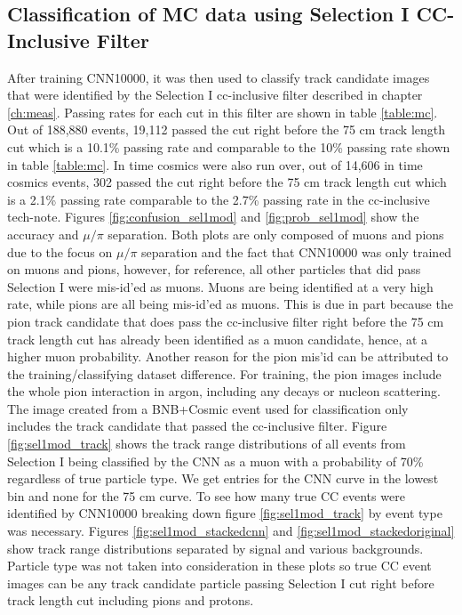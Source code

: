 \subsection{Classification of MC data using Selection I CC-Inclusive Filter}

After training CNN10000, it was then used to classify track candidate images that were identified by the Selection I cc-inclusive filter described in chapter \ref{ch:meas}. Passing rates for each cut in this filter are shown in table \ref{table:mc}. Out of 188,880 events, 19,112 passed the cut right before the 75 cm track length cut which is a 10.1\% passing rate and comparable to the 10\% passing rate shown in table \ref{table:mc}. In time cosmics were also run over, out of 14,606 in time cosmics events, 302 passed the cut right before the 75 cm track length cut which is a 2.1\% passing rate comparable to the 2.7\% passing rate in the cc-inclusive tech-note. Figures \ref{fig:confusion_sel1mod} and \ref{fig:prob_sel1mod} show the accuracy and $\mu/\pi$ separation. Both plots are only composed of muons and pions due to the focus on $\mu/\pi$ separation and the fact that CNN10000 was only trained on muons and pions, however, for reference, all other particles that did pass Selection I were mis-id'ed as muons. Muons are being identified at a very high rate, while pions are all being mis-id'ed as muons. This is due in part because the pion track candidate that does pass the cc-inclusive filter right before the 75 cm track length cut has already been identified as a muon candidate, hence, at a higher muon probability. Another reason for the pion mis'id can be attributed to the training/classifying dataset difference. For training, the pion images include the whole pion interaction in argon, including any decays or nucleon scattering. The image created from a BNB+Cosmic event used for classification only includes the track candidate that passed the cc-inclusive filter.
Figure \ref{fig:sel1mod_track} shows the track range distributions of all events from Selection I being classified by the CNN as a muon with a probability of 70\% regardless of true particle type. We get entries for the CNN curve in the lowest bin and none for the 75 cm curve. To see how many true CC events were identified by CNN10000 breaking down figure \ref{fig:sel1mod_track} by event type was necessary. Figures \ref{fig:sel1mod_stackedcnn} and \ref{fig:sel1mod_stackedoriginal} show track range distributions separated by signal and various backgrounds. Particle type was not taken into consideration in these plots so true CC event images can be any track candidate particle passing Selection I cut right before track length cut including pions and protons. 

